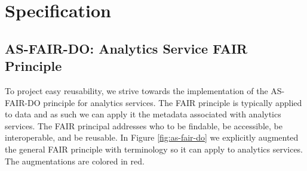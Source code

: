 \documentclass[12pt]{article}
\begin{document}
\section{Specification}


\subsection{AS-FAIR-DO: Analytics Service FAIR Principle}

To project easy reusability, we strive towards the implementation of the AS-FAIR-DO principle for analytics services. The FAIR principle is typically applied to data and as such we can apply it the metadata associated with analytics services. The FAIR principal addresses who to be findable, be accessible, be interoperable, and be reusable. In Figure \ref{fig:as-fair-do} we explicitly augmented the general FAIR principle with terminology so it can apply to analytics services. The augmentations are colored in red.
\end{document}

